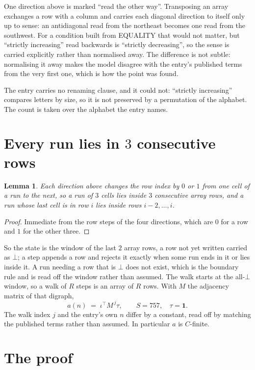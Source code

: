 \documentclass[11pt,a4paper]{article}
\theoremstyle{plain}
\newtheorem{lemma}[theorem]{Lemma}
\theoremstyle{definition}
\begin{document}
One direction above is marked ``read the other way''. Transposing an array exchanges a row with
a column and carries each diagonal direction to itself only up to sense: an antidiagonal read
from the northeast becomes one read from the southwest. For a condition built from EQUALITY
that would not matter, but ``strictly increasing'' read backwards is ``strictly decreasing'',
so the sense is carried explicitly rather than normalised away. The
difference is not subtle: normalising it away makes the model disagree with the entry's
published terms from the very first one, which is how the point was found.

The entry carries no renaming clause, and it could not: ``strictly increasing'' compares
letters by size, so it is not preserved by a permutation of the alphabet. The count is taken
over the alphabet the entry names.

\section{Every run lies in $3$ consecutive rows}

\begin{lemma}\label{lem:win}
Each direction above changes the row index by $0$ or $1$ from one cell of a run to the next, so
a run of $3$ cells lies inside $3$ consecutive array rows, and a run whose last cell is in
row $i$ lies inside rows $i-2,\dots,i$.
\end{lemma}

\begin{proof}
Immediate from the row steps of the four directions, which are $0$ for a row and $1$ for the
other three.
\end{proof}

So the state is the window of the last $2$ array rows, a row not yet written carried as
$\bot$; a step appends a row and rejects it exactly when some run ends in it or lies inside it.
A run needing a row that is $\bot$ does not exist, which is the boundary rule and is read off
the window rather than assumed. The walk starts at the all-$\bot$ window, so a walk of $R$ steps
is an array of $R$ rows. With $M$ the adjacency matrix of that digraph,
\[
a(n)\;=\;\iota^{\!\top}M^{\,j}\tau ,\qquad S=757,\quad\tau=\mathbf{1} .
\]
The walk index $j$ and the entry's own $n$ differ by a constant, read off by matching the
published terms rather than assumed. In particular $a$ is $C$-finite.

\section{The proof}
\end{document}
